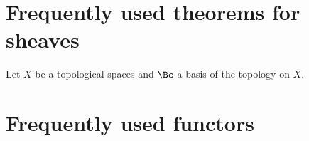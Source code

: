 \chapter{Frequently used theorems for sheaves}

\begin{prop}
    Let $X$ be a topological spaces and $\Bc$ a basis of the topology on $X$. 
\end{prop}




\chapter{Frequently used functors}